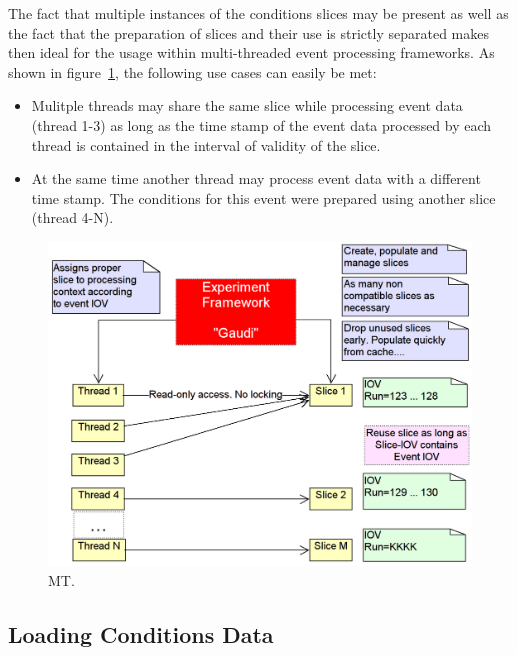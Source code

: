 \documentclass[10pt,a4paper]{article}
\begin{document}
\noindent
The fact that multiple instances of the conditions slices may be present 
as well as the fact that the preparation of slices and their use is strictly
separated makes then ideal for the usage within multi-threaded event 
processing frameworks. As shown in 
figure~\ref{fig:ddcond-multi-threaded-processing}, 
the following use cases can easily be met:
\begin{itemize}
\item Mulitple threads may share the same slice while processing event data
      (thread 1-3) as long as the time stamp of the event data processed 
      by each thread is contained in the interval of validity of the
      slice.
\item At the same time another thread may process event data with a different
      time stamp. The conditions for this event were prepared using another slice
      (thread 4-N).
\end{itemize}

\begin{figure}[t]
  \begin{center}\includegraphics[width=15cm] {DDCond-ConditionsMT.png}
    \caption{MT.}
    \label{fig:ddcond-multi-threaded-processing}
  \end{center}
\end{figure}
\vspace{-0.5cm}


\subsection{Loading Conditions Data}
\label{subsec:ddcond-data-loading}
\end{document}
